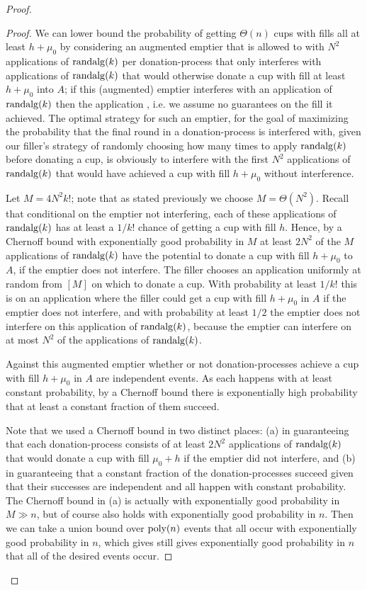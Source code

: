 \begin{proof}
\begin{proof}
  We can lower bound the probability of getting $\Theta(n)$ cups
  with fills all at least $h + \mu_0$ by considering an augmented
  emptier that is allowed to  with $N^2$
  applications of $\operatorname{\text{\textup{randalg}}}(k)$ per donation-process that only
  interferes with applications of $\operatorname{\text{\textup{randalg}}}(k)$ that would
  otherwise donate a cup with fill at least $h + \mu_0$ into $A$;
  if this (augmented) emptier interferes with an application of
  $\operatorname{\text{\textup{randalg}}}(k)$ then the application , i.e.
  we assume no guarantees on the fill it achieved.
  The optimal strategy for such an emptier, for the goal of
  maximizing the probability that the final round in a
  donation-process is interfered with, given our filler's
  strategy of randomly choosing how many times to apply
  $\operatorname{\text{\textup{randalg}}}(k)$ before donating a cup, is obviously to interfere
  with the first $N^2$ applications of $\operatorname{\text{\textup{randalg}}}(k)$ that would
  have achieved a cup with fill $h+\mu_0$ without interference. 

  Let $M = 4N^2 k!$; note that as stated previously we choose $M=\Theta(N^2)$. 
  Recall that conditional on the
  emptier not interfering, each of these applications of
  $\operatorname{\text{\textup{randalg}}}(k)$ has at least a $1/k!$ chance of getting a cup
  with fill $h$. Hence, by a Chernoff bound with exponentially
  good probability in $M$ at least $2N^2$ of the $M$ applications of
  $\operatorname{\text{\textup{randalg}}}(k)$ have the potential to donate a cup with fill
  $h+\mu_0$ to $A$, if the emptier does not interfere. The filler
  chooses an application uniformly at random from $[M]$ on which
  to donate a cup. With probability at least $1/k!$ this is on an
  application where the filler could get a cup with fill
  $h+\mu_0$ in $A$ if the emptier does not interfere, and with
  probability at least $1/2$ the emptier does not interfere on
  this application of $\operatorname{\text{\textup{randalg}}}(k)$, because the emptier can
  interfere on at most $N^2$ of the applications of $\operatorname{\text{\textup{randalg}}}(k)$. 

  Against this augmented emptier whether or not
  donation-processes achieve a cup with fill $h+\mu_0$ in $A$ are
  independent events. As each happens with at least constant
  probability, by a Chernoff bound there is exponentially high
  probability that at least a constant fraction of them succeed.

  Note that we used a Chernoff bound in two distinct places: (a)
  in guaranteeing that each donation-process consists of at least
  $2N^2$ applications of $\operatorname{\text{\textup{randalg}}}(k)$ that would donate a cup with
  fill $\mu_0 + h$ if the emptier did not interfere, and (b) in
  guaranteeing that a constant fraction of the donation-processes
  succeed given that their successes are independent and all
  happen with constant probability. The Chernoff bound in (a) is
  actually with exponentially good probability in $M \gg n$, but
  of course also holds with exponentially good probability in
  $n$. Then we can take a union bound over $\operatorname{\text{poly}}(n)$ events that
  all occur with exponentially good probability in $n$, which
  gives still gives exponentially good
  probability in $n$ that all of the desired events occur.


\end{proof}
\end{proof}
